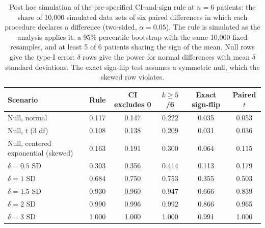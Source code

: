 
\begin{table}[t]
\caption{Post hoc simulation of the pre-specified CI-and-sign rule at $n = 6$ patients: the share of 10,000 simulated data sets of six paired differences in which each procedure declares a difference (two-sided, $\alpha = 0.05$). The rule is simulated as the analysis applies it: a 95\% percentile bootstrap with the same 10,000 fixed resamples, and at least 5 of 6 patients sharing the sign of the mean. Null rows give the type-I error; $\delta$ rows give the power for normal differences with mean $\delta$ standard deviations. The exact sign-flip test assumes a symmetric null, which the skewed row violates.}
\label{tab:rule-simulation}
\centering
\renewcommand{\baselinestretch}{1}\small
\begin{tabular}{@{}lccccc@{}}
\toprule
Scenario & Rule & CI excludes 0 & $k \geq 5$/6 & Exact sign-flip & Paired $t$ \\
\midrule
Null, normal & 0.117 & 0.147 & 0.222 & 0.035 & 0.053 \\
Null, $t$ (3 df) & 0.108 & 0.138 & 0.209 & 0.031 & 0.036 \\
Null, centered exponential (skewed) & 0.163 & 0.191 & 0.300 & 0.064 & 0.115 \\
$\delta = 0.5$ SD & 0.303 & 0.356 & 0.414 & 0.113 & 0.179 \\
$\delta = 1$ SD & 0.684 & 0.750 & 0.753 & 0.355 & 0.503 \\
$\delta = 1.5$ SD & 0.930 & 0.960 & 0.947 & 0.666 & 0.839 \\
$\delta = 2$ SD & 0.990 & 0.996 & 0.992 & 0.866 & 0.965 \\
$\delta = 3$ SD & 1.000 & 1.000 & 1.000 & 0.991 & 1.000 \\
\bottomrule
\end{tabular}
\end{table}
